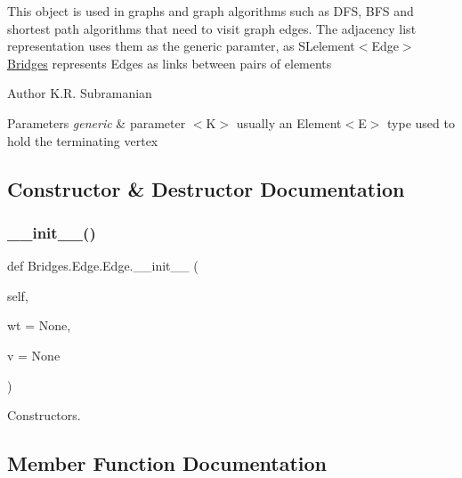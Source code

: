 This object is used in graphs and graph algorithms such as D\+FS, B\+FS and shortest path algorithms that need to visit graph edges. The adjacency list representation uses them as the generic paramter, as S\+Lelement$<$\+Edge$>$ \mbox{\hyperlink{namespace_bridges_1_1_bridges}{Bridges}} represents Edges as links between pairs of elements

\begin{DoxyAuthor}{Author}
K.\+R. Subramanian
\end{DoxyAuthor}

\begin{DoxyParams}{Parameters}
{\em generic} & parameter $<$\+K$>$ usually an Element$<$\+E$>$ type used to hold the terminating vertex \\
\hline
\end{DoxyParams}


\subsection{Constructor \& Destructor Documentation}
\mbox{\label{class_bridges_1_1_edge_1_1_edge_a52aedc015b8b0b4d4ac55a74c0c7e217}} 
\subsubsection{\texorpdfstring{\+\_\+\+\_\+init\+\_\+\+\_\+()}{\_\_init\_\_()}}
{\footnotesize\ttfamily def Bridges.\+Edge.\+Edge.\+\_\+\+\_\+init\+\_\+\+\_\+ (\begin{DoxyParamCaption}\item[{}]{self,  }\item[{}]{wt = {\ttfamily None},  }\item[{}]{v = {\ttfamily None} }\end{DoxyParamCaption})}



Constructors. 



\subsection{Member Function Documentation}
\mbox{\label{class_bridges_1_1_edge_1_1_edge_a96ac5e5acb598afb3d417627deb120fc}} 
